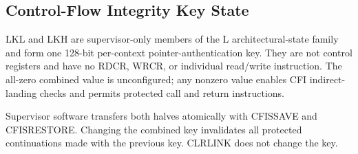 \subsection{Control-Flow Integrity Key State}\label{section:cfi-key-state}
LKL and LKH are supervisor-only members of the L architectural-state family and form one 128-bit per-context pointer-authentication key. They are not control registers and have no RDCR, WRCR, or individual read/write instruction. The all-zero combined value is unconfigured; any nonzero value enables CFI indirect-landing checks and permits protected call and return instructions.

Supervisor software transfers both halves atomically with CFISSAVE and CFISRESTORE. Changing the combined key invalidates all protected continuations made with the previous key. CLRLINK does not change the key.
